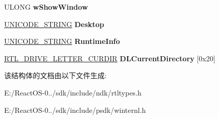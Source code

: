 \begin{DoxyCompactItemize}
U\+L\+O\+NG {\bfseries w\+Show\+Window}
\item 
\mbox{\label{struct___r_t_l___u_s_e_r___p_r_o_c_e_s_s___p_a_r_a_m_e_t_e_r_s_a3e7d0c2d5f1eef8653a65d8831ed96af}} 
\hyperlink{struct___u_n_i_c_o_d_e___s_t_r_i_n_g}{U\+N\+I\+C\+O\+D\+E\+\_\+\+S\+T\+R\+I\+NG} {\bfseries Desktop}
\item 
\mbox{\label{struct___r_t_l___u_s_e_r___p_r_o_c_e_s_s___p_a_r_a_m_e_t_e_r_s_a4bdd7e3c99515d462b52a9ce7f38038d}} 
\hyperlink{struct___u_n_i_c_o_d_e___s_t_r_i_n_g}{U\+N\+I\+C\+O\+D\+E\+\_\+\+S\+T\+R\+I\+NG} {\bfseries Runtime\+Info}
\item 
\mbox{\label{struct___r_t_l___u_s_e_r___p_r_o_c_e_s_s___p_a_r_a_m_e_t_e_r_s_a9baa3e6a7372a9cb5e6552041947ef08}} 
\hyperlink{struct_r_t_l___d_r_i_v_e___l_e_t_t_e_r___c_u_r_d_i_r}{R\+T\+L\+\_\+\+D\+R\+I\+V\+E\+\_\+\+L\+E\+T\+T\+E\+R\+\_\+\+C\+U\+R\+D\+IR} {\bfseries D\+L\+Current\+Directory} \mbox{[}0x20\mbox{]}
\end{DoxyCompactItemize}


该结构体的文档由以下文件生成\+:\begin{DoxyCompactItemize}
\item 
E\+:/\+React\+O\+S-\/0../sdk/include/ndk/rtltypes.\+h\item 
E\+:/\+React\+O\+S-\/0../sdk/include/psdk/winternl.\+h\end{DoxyCompactItemize}
